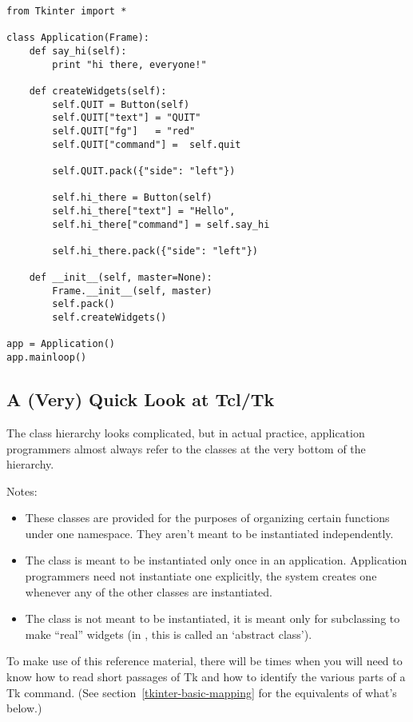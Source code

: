\begin{verbatim}
from Tkinter import *

class Application(Frame):
    def say_hi(self):
        print "hi there, everyone!"

    def createWidgets(self):
        self.QUIT = Button(self)
        self.QUIT["text"] = "QUIT"
        self.QUIT["fg"]   = "red"
        self.QUIT["command"] =  self.quit

        self.QUIT.pack({"side": "left"})

        self.hi_there = Button(self)
        self.hi_there["text"] = "Hello",
        self.hi_there["command"] = self.say_hi

        self.hi_there.pack({"side": "left"})

    def __init__(self, master=None):
        Frame.__init__(self, master)
        self.pack()
        self.createWidgets()

app = Application()
app.mainloop()
\end{verbatim}


\subsection{A (Very) Quick Look at Tcl/Tk} %

The class hierarchy looks complicated, but in actual practice,
application programmers almost always refer to the classes at the very
bottom of the hierarchy. 

Notes:
\begin{itemize}
\item   These classes are provided for the purposes of
organizing certain functions under one namespace. They aren't meant to
be instantiated independently.

\item    The  class is meant to be instantiated only once in
an application. Application programmers need not instantiate one
explicitly, the system creates one whenever any of the other classes
are instantiated.

\item    The  class is not meant to be instantiated, it
is meant only for subclassing to make ``real'' widgets (in \Cpp, this
is called an `abstract class').
\end{itemize}

To make use of this reference material, there will be times when you
will need to know how to read short passages of Tk and how to identify
the various parts of a Tk command.  
(See section~\ref{tkinter-basic-mapping} for the
 equivalents of what's below.)

